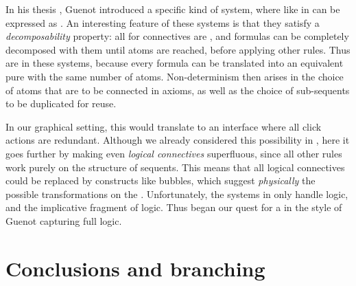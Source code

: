 \begin{scope}
In his thesis \cite{guenot_nested_2013}, Guenot introduced a specific kind of
 system, where like in   can be expressed
as . An interesting feature of these systems is that they satisfy
a \emph{decomposability} property: all  for connectives are
\emph{}, and formulas can be completely decomposed with them until
atoms are reached, before applying other rules. Thus  are
\emph{} in these systems, because every formula can be translated into
an equivalent pure  with the same number of atoms. Non-determinism then
arises in the choice of atoms that are to be connected in axioms, as well as the
choice of sub-sequents to be duplicated for reuse.

In our graphical setting, this would translate to an interface where all click
actions are redundant. Although we already considered this possibility in
, here it goes further by making even \emph{logical
connectives} superfluous, since all other rules work purely on the structure of
sequents. This means that all logical connectives could be replaced by
 constructs like bubbles, which suggest \emph{physically} the
possible transformations on the .
Unfortunately, the systems in \cite{guenot_nested_2013} only handle 
logic, and the implicative fragment of  logic. Thus began our
quest for a  in the style of Guenot capturing full 
logic.


\section{Conclusions and branching}


\end{scope}
